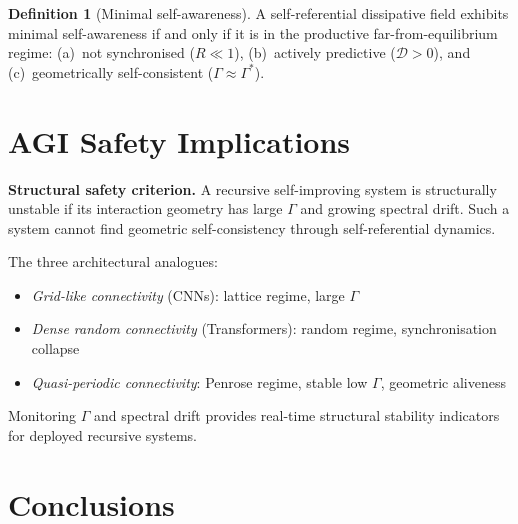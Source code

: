 \documentclass[12pt,a4paper]{article}
\theoremstyle{plain}
\theoremstyle{definition}
\newtheorem{definition}[theorem]{Definition}
\begin{document}
\begin{definition}[Minimal self-awareness]
A self-referential dissipative field exhibits minimal self-awareness if and only if
it is in the productive far-from-equilibrium regime: (a)~not synchronised ($R \ll 1$),
(b)~actively predictive ($\mathcal{D} > 0$), and (c)~geometrically self-consistent
($\Gamma \approx \Gamma^*$).
\end{definition}

\section{AGI Safety Implications}
\label{sec:agi}

\begin{keyresult}
\textbf{Structural safety criterion.} A recursive self-improving system
is structurally unstable if its interaction geometry has large $\Gamma$
and growing spectral drift. Such a system cannot find geometric
self-consistency through self-referential dynamics.
\end{keyresult}

The three architectural analogues:
\begin{itemize}
  \item \emph{Grid-like connectivity} (CNNs): lattice regime, large $\Gamma$
  \item \emph{Dense random connectivity} (Transformers): random regime, synchronisation collapse
  \item \emph{Quasi-periodic connectivity}: Penrose regime, stable low $\Gamma$, geometric aliveness
\end{itemize}

Monitoring $\Gamma$ and spectral drift provides real-time structural stability
indicators for deployed recursive systems.

\section{Conclusions}
\label{sec:conclusions}
\end{document}
